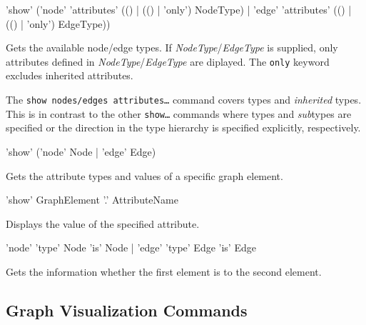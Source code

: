 \begin{rail}
  'show' ('node' 'attributes' (() | (() | 'only') NodeType) | 'edge' 'attributes' (() | (() | 'only') EdgeType))
\end{rail}
Gets the available node/edge  types.
If \emph{NodeType}/\emph{EdgeType} is supplied, only attributes defined in \emph{NodeType}/\emph{EdgeType} are diplayed.
The \texttt{only} keyword excludes inherited attributes.\\
\begin{note}
The \texttt{show nodes/edges attributes\dots} command covers types and \emph{inherited} types.
This is in contrast to the other \texttt{show\dots} commands where types and \emph{sub}types are specified or the direction in the type hierarchy is specified explicitly, respectively.
\end{note}

\begin{rail}
 'show' ('node' Node | 'edge' Edge)
\end{rail}
Gets the attribute types and values of a specific graph element.

\begin{rail}
  'show' GraphElement '.' AttributeName
\end{rail}
Displays the value of the specified attribute.

\begin{rail}
  'node' 'type' Node 'is' Node | 'edge' 'type' Edge 'is' Edge
\end{rail}
Gets the information whether the first element is  to the second element.


\subsection{Graph Visualization Commands}

